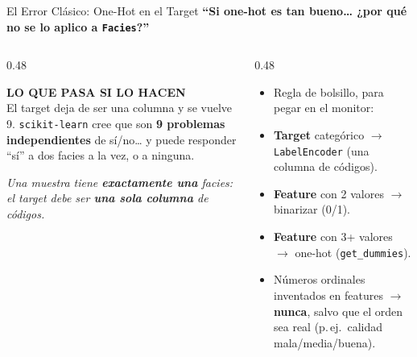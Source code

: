 \documentclass[aspectratio=169, 11pt]{beamer}
\begin{document}
\begin{frame}[shrink=8]{El Error Clásico: One-Hot en el Target}
  \vspace{-4pt}
  {\small\color{arcaDark}\bfseries
    ``Si one-hot es tan bueno\ldots{} ¿por qué no se lo aplico a \texttt{Facies}?''}

  \vspace{8pt}
  \begin{columns}[T]
    \begin{column}{0.48\textwidth}
      \begin{tcolorbox}[colback=arcaGray, colframe=arcaRed, boxrule=0pt, leftrule=3pt,
        arc=3pt, left=6pt, right=6pt, top=5pt, bottom=5pt]
        {\scriptsize\color{arcaRed}\bfseries\faTimes\hspace{4pt}LO QUE PASA SI LO HACEN}\\[4pt]
        {\scriptsize\color{textMuted}
          El target deja de ser una columna y se vuelve 9.
          \texttt{scikit-learn} cree que son \textbf{9 problemas
          independientes} de sí/no\ldots{} y puede responder
          ``sí'' a dos facies a la vez, o a ninguna.}
      \end{tcolorbox}
      \vspace{6pt}
      {\scriptsize\color{textMuted}\itshape
        Una muestra tiene \textbf{exactamente una} facies:
        el target debe ser \textbf{una sola columna} de códigos.}
    \end{column}
    \begin{column}{0.48\textwidth}
      {\footnotesize\color{textMuted}
      \begin{itemize}\setlength{\itemsep}{5pt}
        \item[{\color{codeGreen}\scriptsize\faCheck}]
          Regla de bolsillo, para pegar en el monitor:
        \item[{\color{arcaRed}\scriptsize\faArrowRight}]
          \textbf{Target} categórico \(\to\) \texttt{LabelEncoder}
          (una columna de códigos).
        \item[{\color{arcaRed}\scriptsize\faArrowRight}]
          \textbf{Feature} con 2 valores \(\to\) binarizar (0/1).
        \item[{\color{arcaRed}\scriptsize\faArrowRight}]
          \textbf{Feature} con 3+ valores \(\to\) one-hot
          (\texttt{get\_dummies}).
        \item[{\color{arcaRed}\scriptsize\faBan}]
          Números ordinales inventados en features \(\to\) \textbf{nunca},
          salvo que el orden sea real (p.\,ej.\ calidad mala/media/buena).
      \end{itemize}
      }
    \end{column}
  \end{columns}
\end{frame}
\end{document}

